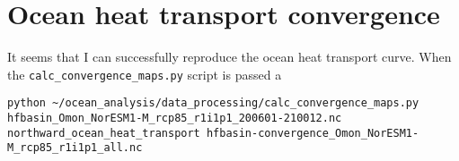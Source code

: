 \section{Ocean heat transport convergence}

It seems that I can successfully reproduce the ocean heat transport curve. When the \texttt{calc_convergence_maps.py} script is passed a   

\begin{verbatim}
python ~/ocean_analysis/data_processing/calc_convergence_maps.py hfbasin_Omon_NorESM1-M_rcp85_r1i1p1_200601-210012.nc northward_ocean_heat_transport hfbasin-convergence_Omon_NorESM1-M_rcp85_r1i1p1_all.nc
\end{verbatim}